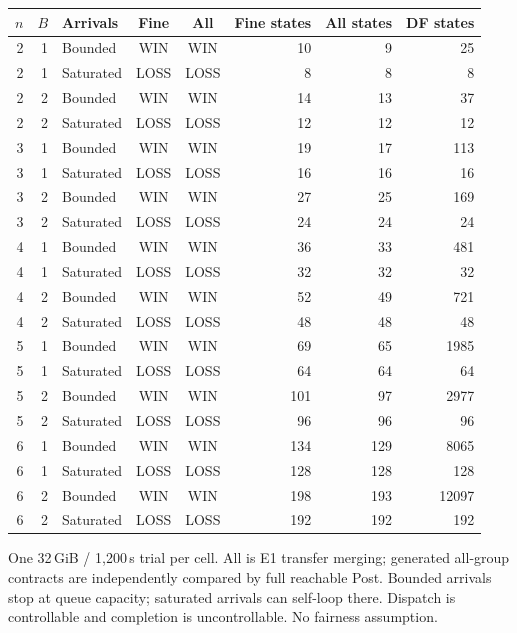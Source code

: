 \begin{tabular}{rrlccrrr}
\toprule
$n$ & $B$ & Arrivals & Fine & All & Fine states & All states & DF states \\
\midrule
2 & 1 & Bounded & WIN & WIN & 10 & 9 & 25 \\
2 & 1 & Saturated & LOSS & LOSS & 8 & 8 & 8 \\
2 & 2 & Bounded & WIN & WIN & 14 & 13 & 37 \\
2 & 2 & Saturated & LOSS & LOSS & 12 & 12 & 12 \\
3 & 1 & Bounded & WIN & WIN & 19 & 17 & 113 \\
3 & 1 & Saturated & LOSS & LOSS & 16 & 16 & 16 \\
3 & 2 & Bounded & WIN & WIN & 27 & 25 & 169 \\
3 & 2 & Saturated & LOSS & LOSS & 24 & 24 & 24 \\
4 & 1 & Bounded & WIN & WIN & 36 & 33 & 481 \\
4 & 1 & Saturated & LOSS & LOSS & 32 & 32 & 32 \\
4 & 2 & Bounded & WIN & WIN & 52 & 49 & 721 \\
4 & 2 & Saturated & LOSS & LOSS & 48 & 48 & 48 \\
5 & 1 & Bounded & WIN & WIN & 69 & 65 & 1985 \\
5 & 1 & Saturated & LOSS & LOSS & 64 & 64 & 64 \\
5 & 2 & Bounded & WIN & WIN & 101 & 97 & 2977 \\
5 & 2 & Saturated & LOSS & LOSS & 96 & 96 & 96 \\
6 & 1 & Bounded & WIN & WIN & 134 & 129 & 8065 \\
6 & 1 & Saturated & LOSS & LOSS & 128 & 128 & 128 \\
6 & 2 & Bounded & WIN & WIN & 198 & 193 & 12097 \\
6 & 2 & Saturated & LOSS & LOSS & 192 & 192 & 192 \\
\bottomrule
\end{tabular}
{\par\smallskip\footnotesize One 32\,GiB / 1,200\,s trial per cell. All is E1 transfer merging; generated all-group contracts are independently compared by full reachable Post. Bounded arrivals stop at queue capacity; saturated arrivals can self-loop there. Dispatch is controllable and completion is uncontrollable. No fairness assumption.}
